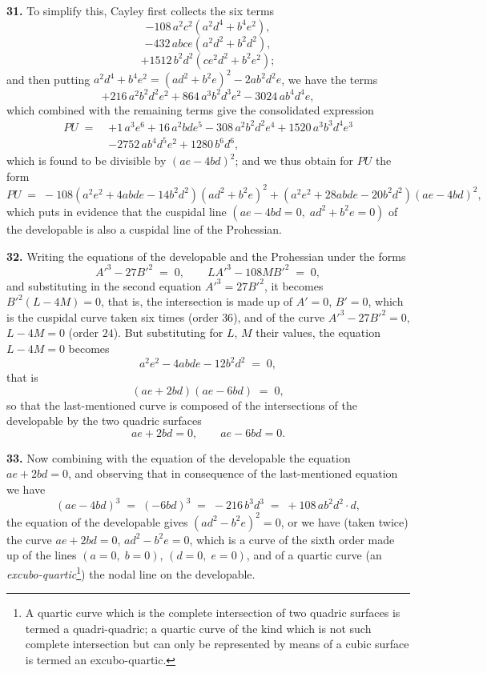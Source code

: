 \documentclass[11pt,a4paper]{article}
\begin{document}
\medskip

\textbf{31.} To simplify this, Cayley first collects the six terms
\[
-108\, a^2 c^2 (a^2 d^4 + b^4 e^2),
\]
\[
-432\, abce(a^2 d^2 + b^2 d^2),
\]
\[
+1512\, b^2 d^2 (c e^2 d^2 + b^2 e^2);
\]
and then putting $a^2 d^4 + b^4 e^2 = (ad^2 + b^2 e)^2 - 2ab^2 d^2 e$, we have the terms
\[
+216\, a^2 b^2 d^2 e^2 + 864\, a^3 b^2 d^3 e^2 - 3024\, ab^4 d^4 e,
\]
which combined with the remaining terms give the consolidated expression
\[
\begin{aligned}
PU \;=\; & + 1\, a^3 e^6 + 16\, a^2 bde^5 - 308\, a^2 b^2 d^2 e^4 + 1520\, a^3 b^3 d^4 e^3 \\
& - 2752\, ab^4 d^5 e^2 + 1280\, b^6 d^6,
\end{aligned}
\]
which is found to be divisible by $(ae - 4bd)^2$; and we thus obtain for $PU$ the form
\[
PU \;=\; -108(a^2 e^2 + 4abde - 14b^2 d^2)(ad^2 + b^2 e)^2 + (a^2 e^2 + 28abde - 20b^2 d^2)(ae - 4bd)^2,
\]
which puts in evidence that the cuspidal line $(ae - 4bd = 0,\;ad^2 + b^2 e = 0)$ of the developable is also a cuspidal line of the Prohessian.

\medskip

\textbf{32.} Writing the equations of the developable and the Prohessian under the forms
\[
A'^3 - 27 B'^2 \;=\; 0,\qquad LA'^3 - 108 M B'^2 \;=\; 0,
\]
and substituting in the second equation $A'^3 = 27 B'^2$, it becomes $B'^2(L - 4M) = 0$, that is, the intersection is made up of $A' = 0$, $B' = 0$, which is the cuspidal curve taken six times (order $36$), and of the curve $A'^3 - 27 B'^2 = 0$, $L - 4M = 0$ (order $24$). But substituting for $L$, $M$ their values, the equation $L - 4M = 0$ becomes
\[
a^2 e^2 - 4abde - 12 b^2 d^2 \;=\; 0,
\]
that is
\[
(ae + 2bd)(ae - 6bd) \;=\; 0,
\]
so that the last-mentioned curve is composed of the intersections of the developable by the two quadric surfaces
\[
ae + 2bd = 0,\qquad ae - 6bd = 0.
\]

\medskip

\textbf{33.} Now combining with the equation of the developable the equation $ae + 2bd = 0$, and observing that in consequence of the last-mentioned equation we have
\[
(ae - 4bd)^3 \;=\; (-6bd)^3 \;=\; -216\, b^3 d^3 \;=\; +108\, ab^2 d^2\cdot d,
\]
the equation of the developable gives $(ad^2 - b^2 e)^2 = 0$, or we have (taken twice) the curve $ae + 2bd = 0$, $ad^2 - b^2 e = 0$, which is a curve of the sixth order made up of the lines $(a = 0,\;b = 0)$, $(d = 0,\;e = 0)$, and of a quartic curve (an \emph{excubo-quartic}\footnote{A quartic curve which is the complete intersection of two quadric surfaces is termed a quadri-quadric; a quartic curve of the kind which is not such complete intersection but can only be represented by means of a cubic surface is termed an excubo-quartic.}) the nodal line on the developable.
\end{document}
